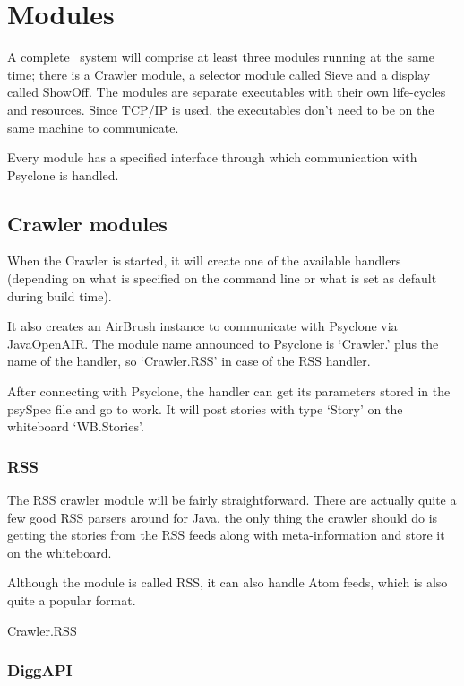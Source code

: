 \section{\label{sct:modules}Modules}

A complete \Amber\ system will comprise at least three modules running at the
same time; there is a Crawler module, a selector module called Sieve and a
display called ShowOff. The modules are separate executables with their own
life-cycles and resources. Since TCP/IP is used, the executables don't need to
be on the same machine to communicate.

Every module has a specified interface through which communication with
Psyclone is handled.

\subsection{Crawler modules}

When the Crawler is started, it will create one of the available handlers
(depending on what is specified on the command line or what is set as default
during build time). 

It also creates an AirBrush instance to communicate with Psyclone via
Java\-Open\-AIR. The module name announced to Psyclone is `Crawler.' plus the
name of the handler, so `Crawler.RSS' in case of the RSS handler.

After connecting with Psyclone, the handler can get its parameters stored in
the psySpec file and go to work. It will post stories with type `Story'  on the
whiteboard `WB.Stories'.

\subsubsection{RSS}

The RSS crawler module will be fairly straightforward. There are actually quite
a few good RSS parsers around for Java, the only thing the crawler should do is
getting the stories from the RSS feeds along with meta-information and store it
on the whiteboard.

Although the module is called RSS, it can also handle Atom feeds, which is also
quite a popular format.

\begin{module}{Crawler.RSS}
\end{module}

\subsubsection{DiggAPI}

